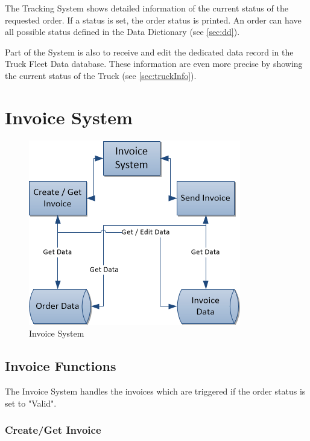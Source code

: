\documentclass[11pt,a4paper,oneside,svgnames]{report}
\begin{document}
The Tracking System shows detailed information of the current status of the requested order. If a status is set, the order status is printed. An order can have all possible status defined in the Data Dictionary (see \ref{sec:dd}).

Part of the System is also to receive and edit the dedicated data record in the Truck Fleet Data database. These information are even more precise by showing the current status of the Truck (see  \ref{sec:truckInfo}).

\section{Invoice System}

\begin{figure}[H]
 \begin{center}
  \includegraphics[width=\textwidth]{InvoiceSystem.png}
 \end{center}
 \caption{Invoice System}
\end{figure}

\subsection{Invoice Functions}

The Invoice System handles the invoices which are triggered if the order status is set to "Valid".

\subsubsection{Create/Get Invoice}
\end{document}
